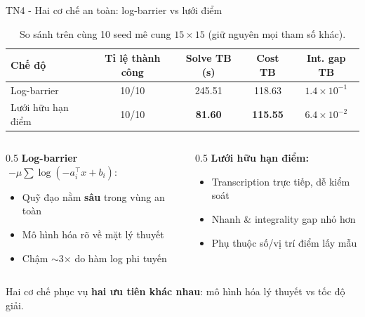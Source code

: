 \documentclass[aspectratio=169]{beamer}
\begin{document}
\begin{frame}{TN4 - Hai cơ chế an toàn: log-barrier vs lưới điểm}
    \footnotesize
    \begin{table}
        \centering\footnotesize
        \caption{So sánh trên cùng 10 seed mê cung $15\!\times\!15$ (giữ nguyên mọi tham số khác).}
        \begin{tabular}{lcccc}
            \toprule
            \textbf{Chế độ}   & \textbf{Tỉ lệ thành công} & \textbf{Solve TB (s)} & \textbf{Cost TB} & \textbf{Int. gap TB}            \\
            \midrule
            Log-barrier       & 10/10                     & 245.51                & 118.63           & $1.4\!\times\!10^{-1}$          \\
            Lưới hữu hạn điểm & 10/10                     & \textbf{81.60}        & \textbf{115.55}  & \textbf{$6.4\!\times\!10^{-2}$} \\
            \bottomrule
        \end{tabular}
    \end{table}

    \begin{columns}[T,onlytextwidth]
        \begin{column}{0.5\textwidth}
            \textbf{Log-barrier} $\;{-\mu\sum\log(-a_i^\top x + b_i)}$:
            \footnotesize
            \begin{itemize}\itemsep0pt
                \item[$+$] Quỹ đạo nằm \textbf{sâu} trong vùng an toàn
                \item[$+$] Mô hình hóa rõ về mặt lý thuyết
                \item[$-$] Chậm $\sim$3$\times$ do hàm log phi tuyến
            \end{itemize}
        \end{column}
        \begin{column}{0.5\textwidth}
            \textbf{Lưới hữu hạn điểm:}
            \footnotesize
            \begin{itemize}\itemsep0pt
                \item[$+$] Transcription trực tiếp, dễ kiểm soát
                \item[$+$] Nhanh \& integrality gap nhỏ hơn
                \item[$-$] Phụ thuộc số/vị trí điểm lấy mẫu
            \end{itemize}
        \end{column}
    \end{columns}

    \vspace{0.2em}
    {\footnotesize\alert{Hai cơ chế phục vụ \textbf{hai ưu tiên khác nhau}: mô hình hóa lý thuyết vs tốc độ giải.}}
\end{frame}
\end{document}
